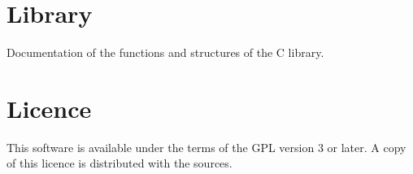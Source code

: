 \documentclass[a4paper,12pt]{article}
\begin{document}

\section{Library}

Documentation of the functions and structures of the C library.


\section{Licence}

This software is available under the terms of the GPL version 3 or later.
A copy of this licence is distributed with the sources.
\end{document}
